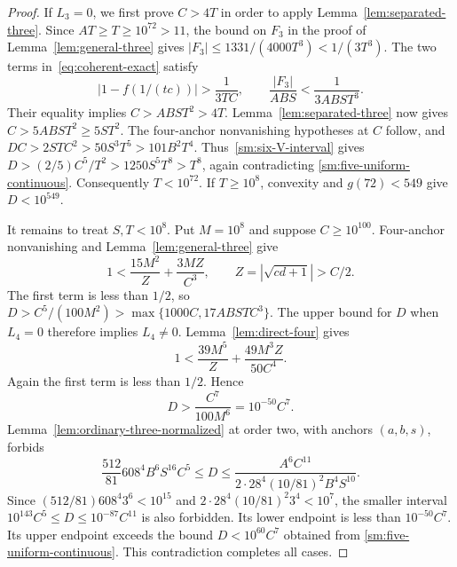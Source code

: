 \documentclass[12pt]{article}
\numberwithin{equation}{section}
\begin{document}
\begin{proof}
If $L_3=0$, we first prove $C>4T$ in order to apply
Lemma~\ref{lem:separated-three}. Since $AT\ge T\ge10^{72}>11$,
the bound on $F_3$ in the proof of Lemma~\ref{lem:general-three}
gives $|F_3|\le1331/(4000T^3)<1/(3T^3)$.
The two terms in~\eqref{eq:coherent-exact} satisfy
\[
 |1-f(1/(tc))|>\frac1{3TC},\qquad
 \frac{|F_3|}{ABS}<\frac1{3ABS T^3}.
\]
Their equality implies $C>ABS T^2>4T$.
Lemma~\ref{lem:separated-three} now gives
$C>5ABS T^2\ge5ST^2$. The four-anchor nonvanishing hypotheses
at $C$ follow, and
$DC>2STC^2>50S^3T^5>101B^2T^4$.
Thus~\eqref{sm:six-V-interval} gives
$D>(2/5)C^5/T^2>1250S^5T^8>T^8$, again contradicting
\eqref{sm:five-uniform-continuous}. Consequently $T<10^{72}$.
If $T\ge10^8$, convexity and $g(72)<549$ give $D<10^{549}$.

It remains to treat $S,T<10^8$. Put $M=10^8$ and suppose
$C\ge10^{100}$. Four-anchor nonvanishing and
Lemma~\ref{lem:general-three} give
\[
 1<\frac{15M^2}{Z}+\frac{3MZ}{C^3},\qquad
 Z=|\sqrt{cd+1}|>C/2.
\]
The first term is less than $1/2$, so
$D>C^5/(100M^2)>\max\{1000C,17ABSTC^3\}$.
The upper bound for $D$ when $L_4=0$ therefore implies $L_4\ne0$.
Lemma~\ref{lem:direct-four} gives
\[
 1<\frac{39M^5}{Z}+\frac{49M^3Z}{50C^4}.
\]
Again the first term is less than $1/2$. Hence
\begin{equation*}
 D>\frac{C^7}{100M^6}=10^{-50}C^7.
\end{equation*}
Lemma~\ref{lem:ordinary-three-normalized} at order two, with anchors
$(a,b,s)$, forbids
\[
 \frac{512}{81}608^4B^6S^{16}C^5\le D
 \le\frac{A^6C^{11}}{2\cdot28^4(10/81)^2B^4S^{10}}.
\]
Since $(512/81)608^4 3^6<10^{15}$ and
$2\cdot28^4(10/81)^2 3^4<10^7$, the smaller interval
$10^{143}C^5\le D\le10^{-87}C^{11}$ is also forbidden.
Its lower endpoint is less than $10^{-50}C^7$.
Its upper endpoint exceeds the bound $D<10^{60}C^7$ obtained from
\eqref{sm:five-uniform-continuous}. This contradiction completes all cases.
\end{proof}
\end{document}
